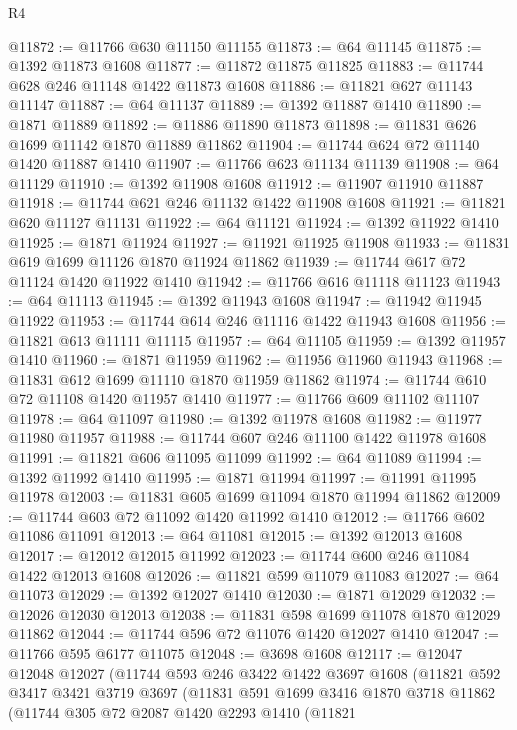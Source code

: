\begin{lexlean}{R4}
\begin{coremodule}
@11872 := @11766 @630 @11150 @11155
@11873 := @64 @11145
@11875 := @1392 @11873 @1608
@11877 := @11872 @11875 @11825
@11883 := @11744 @628 @246 @11148 @1422 @11873 @1608
@11886 := @11821 @627 @11143 @11147
@11887 := @64 @11137
@11889 := @1392 @11887 @1410
@11890 := @1871 @11889
@11892 := @11886 @11890 @11873
@11898 := @11831 @626 @1699 @11142 @1870 @11889 @11862
@11904 := @11744 @624 @72 @11140 @1420 @11887 @1410
@11907 := @11766 @623 @11134 @11139
@11908 := @64 @11129
@11910 := @1392 @11908 @1608
@11912 := @11907 @11910 @11887
@11918 := @11744 @621 @246 @11132 @1422 @11908 @1608
@11921 := @11821 @620 @11127 @11131
@11922 := @64 @11121
@11924 := @1392 @11922 @1410
@11925 := @1871 @11924
@11927 := @11921 @11925 @11908
@11933 := @11831 @619 @1699 @11126 @1870 @11924 @11862
@11939 := @11744 @617 @72 @11124 @1420 @11922 @1410
@11942 := @11766 @616 @11118 @11123
@11943 := @64 @11113
@11945 := @1392 @11943 @1608
@11947 := @11942 @11945 @11922
@11953 := @11744 @614 @246 @11116 @1422 @11943 @1608
@11956 := @11821 @613 @11111 @11115
@11957 := @64 @11105
@11959 := @1392 @11957 @1410
@11960 := @1871 @11959
@11962 := @11956 @11960 @11943
@11968 := @11831 @612 @1699 @11110 @1870 @11959 @11862
@11974 := @11744 @610 @72 @11108 @1420 @11957 @1410
@11977 := @11766 @609 @11102 @11107
@11978 := @64 @11097
@11980 := @1392 @11978 @1608
@11982 := @11977 @11980 @11957
@11988 := @11744 @607 @246 @11100 @1422 @11978 @1608
@11991 := @11821 @606 @11095 @11099
@11992 := @64 @11089
@11994 := @1392 @11992 @1410
@11995 := @1871 @11994
@11997 := @11991 @11995 @11978
@12003 := @11831 @605 @1699 @11094 @1870 @11994 @11862
@12009 := @11744 @603 @72 @11092 @1420 @11992 @1410
@12012 := @11766 @602 @11086 @11091
@12013 := @64 @11081
@12015 := @1392 @12013 @1608
@12017 := @12012 @12015 @11992
@12023 := @11744 @600 @246 @11084 @1422 @12013 @1608
@12026 := @11821 @599 @11079 @11083
@12027 := @64 @11073
@12029 := @1392 @12027 @1410
@12030 := @1871 @12029
@12032 := @12026 @12030 @12013
@12038 := @11831 @598 @1699 @11078 @1870 @12029 @11862
@12044 := @11744 @596 @72 @11076 @1420 @12027 @1410
@12047 := @11766 @595 @6177 @11075
@12048 := @3698 @1608
@12117 := @12047
    @12048
    @12027
    (@11744
      @593
      @246
      @3422
      @1422
      @3697
      @1608
      (@11821
        @592
        @3417
        @3421
        @3719
        @3697
        (@11831
          @591
          @1699
          @3416
          @1870
          @3718
          @11862
          (@11744
            @305
            @72
            @2087
            @1420
            @2293
            @1410
            (@11821

\end{coremodule}
\end{lexlean}
